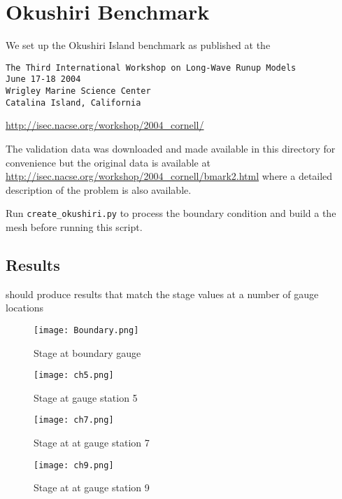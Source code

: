 
\section{Okushiri Benchmark}

We set up the Okushiri Island benchmark as published at the
\begin{verbatim}
The Third International Workshop on Long-Wave Runup Models
June 17-18 2004
Wrigley Marine Science Center
Catalina Island, California
\end{verbatim}
\url{http://isec.nacse.org/workshop/2004_cornell/}


The validation data was downloaded and made available in this directory
for convenience but the original data is available at
\url{http://isec.nacse.org/workshop/2004_cornell/bmark2.html}
where a detailed description of the problem is also available.


Run \verb|create_okushiri.py| to process the boundary condition and build a the
mesh before running this script.

\subsection{Results}

\anuga{} should produce results that match the stage values at a number of gauge locations



\begin{figure}[h]
\begin{center}
\texttt{[image: Boundary.png]}
\caption{Stage at boundary gauge}
\label{okushiri:boundary}
\end{center}
\end{figure}

\begin{figure}[h]
\begin{center}
\texttt{[image: ch5.png]}
\caption{Stage at gauge station 5}
\label{okushiri:ch:five}
\end{center}
\end{figure}

\begin{figure}[h]
\begin{center}
\texttt{[image: ch7.png]}
\caption{Stage at at gauge station 7}
\label{okushiri:ch_seven}
\end{center}
\end{figure}

\begin{figure}[h]
\begin{center}
\texttt{[image: ch9.png]}
\caption{Stage at at gauge station 9}
\label{okushiri:ch_nine}
\end{center}
\end{figure}




\endinput
